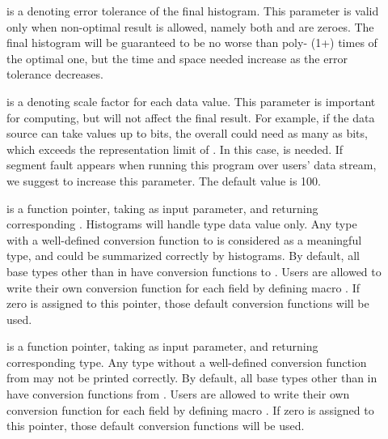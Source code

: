 \begin{description}
\item[] is a  denoting error tolerance of the
  final histogram. This parameter is valid only when non-optimal
  result is allowed, namely both  and  are
  zeroes. The final histogram will be guaranteed to be no worse than
  poly- (1+) times of the optimal one, but the time and
  space needed increase as the error tolerance decreases.  

\item[] is a  denoting scale factor for
  each data value. This parameter is important for computing, but will
  not affect the final result. For example, if the data source can
  take values up to  bits, the overall  could need
  as many as  bits, which exceeds the representation limit of
  \pads{}. In this case,  is needed. If segment fault
  appears when running this program over users' data stream, we
  suggest to increase this parameter.  The default value is 100.       

\item[] is a function pointer, taking
   as input parameter, and returning corresponding
  . Histograms will handle  type data value 
  only. Any type with a well-defined conversion function to
   is considered as a meaningful type, and could be summarized
  correctly by histograms. By default, all base types other than  in \pads{} have
  conversion functions to . Users are allowed to write their
  own conversion function for each field by defining macro . If zero is assigned to this pointer, those default
  conversion functions will be used.
   
\item[] is a function pointer, taking
   as input parameter, and returning corresponding
   type. Any type without a well-defined conversion
  function from  may not be printed correctly. By
  default, all base types other than  in \pads{} have
  conversion functions from . Users are allowed to write their
  own conversion function for each field by defining macro . If zero is assigned to this pointer, those default
  conversion functions will be used.

\end{description}

